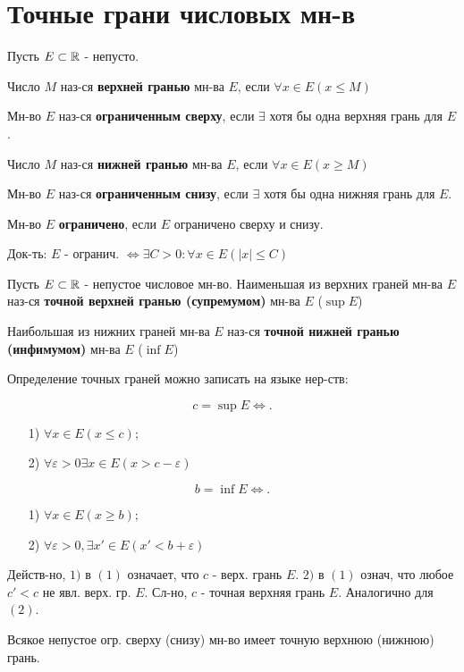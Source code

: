 \section{Точные грани числовых мн-в}
\begin{definition}
Пусть $E \subset \mathbb{R}$ - непусто.

Число $M$ наз-ся \textbf{верхней гранью} мн-ва $E$, если $\forall x \in E (x \leq M)$

Мн-во $E$ наз-ся \textbf{ограниченным сверху}, если $\exists $ хотя бы одна верхняя грань для $E$.

Число $M$ наз-ся \textbf{нижней гранью} мн-ва $E$, если $\forall x \in E (x \geq M)$

Мн-во $E$ наз-ся \textbf{ограниченным снизу}, если $\exists $ хотя бы одна нижняя грань для $E$.

Мн-во $E$ \textbf{ограничено}, если $E$ ограничено сверху и снизу.
\end{definition}
\begin{task}
Док-ть: $E \text{ - огранич. } \iff \exists C > 0 \colon  \forall x \in E (|x| \leq C)$
\end{task}

\begin{definition}
Пусть $E \subset \mathbb{R}$ - непустое числовое мн-во. Наименьшая из верхних граней мн-ва $E$ наз-ся \textbf{точной верхней гранью (супремумом)} мн-ва $E$ ($\sup E$)

Наибольшая из нижних граней мн-ва $E$ наз-ся \textbf{точной нижней гранью (инфимумом)} мн-ва $E$ ($\inf E$)
\end{definition}
\begin{note}
Определение точных граней можно записать на языке нер-ств:

\begin{equation}
    c = \sup E \iff
    .
\end{equation}
\begin{enumerate}
    \item [1) ] $\forall x \in E (x \leq c);$ 
    \item [2) ] $\forall  \varepsilon > 0  \exists  x \in E (x > c - \varepsilon)$
\end{enumerate}


\begin{equation}
b = \inf E \iff
.\end{equation} 
\begin{enumerate}
    \item [1) ] $\forall x \in E (x \geq b);$ 
    \item [2) ] $\forall \varepsilon > 0, \exists x' \in E (x' < b + \varepsilon)$
\end{enumerate}

Действ-но, $1)$ в $(1)$ означает, что $c$ - верх. грань $E$. $2)$ в $(1)$ означ, что любое $c' < c$ не явл. верх. гр. $E$. Сл-но, $c$ - точная верхняя грань $E$. Аналогично для  $(2)$.
\end{note}

\begin{theorem}
Всякое непустое огр. сверху (снизу) мн-во имеет точную верхнюю (нижнюю) грань.
\end{theorem}
